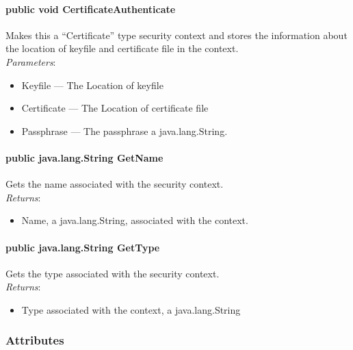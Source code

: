 \documentclass[$Date: 2003/06/26 19:29:31 $]{glabarticle}
\begin{document}
\paragraph{public void CertificateAuthenticate}

Makes this a ``Certificate'' type security context and stores the
information about the location of keyfile and certificate file in the context.\\

\textit{Parameters}:
\begin{itemize}
\item[] Keyfile --- The Location of keyfile
\item[] Certificate --- The Location of certificate file
\item[] Passphrase --- The passphrase a java.lang.String.
\end{itemize}

\paragraph{public java.lang.String GetName}

Gets the name associated with the security context. \\

\textit{Returns}:
\begin{itemize}
\item[] Name, a java.lang.String, associated with the context.
\end{itemize}

\paragraph{public java.lang.String GetType}

Gets the type associated with the security context. \\

\textit{Returns}:
\begin{itemize}
\item[] Type associated with the context, a java.lang.String
\end{itemize}


\subsubsection{Attributes}
\end{document}
